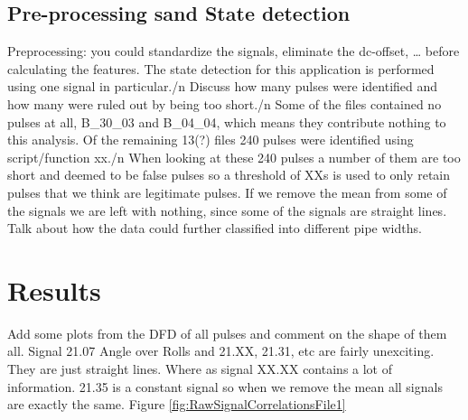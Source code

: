 \documentclass{article}
\begin{document}
\subsection{Pre-processing sand State detection}
Preprocessing: you could standardize the signals, eliminate the dc-offset, … before calculating the features.
The state detection for this application is performed using one signal in particular./n
Discuss how many pulses were identified and how many were ruled out by being too short./n
Some of the files contained no pulses at all, B\_30\_03 and B\_04\_04, which means they contribute nothing to this analysis.
Of the remaining 13(?) files 240 pulses were identified using script/function xx./n
When looking at these 240 pulses a number of them are too short and deemed to be false pulses so a threshold of XXs is used to only retain pulses that we think are legitimate pulses.
If we remove the mean from some of the signals we are left with nothing, since some of the signals are straight lines.
Talk about how the data could further classified into different pipe widths.
\section{Results}
Add some plots from the DFD of all pulses and comment on the shape of them all.
Signal 21.07 Angle over Rolls and 21.XX, 21.31, etc are fairly unexciting. They are just straight lines.
Where as signal XX.XX contains a lot of information.
21.35 is a constant signal so when we remove the mean all signals are exactly the same.
Figure \ref{fig:RawSignalCorrelationsFile1}
\end{document}
